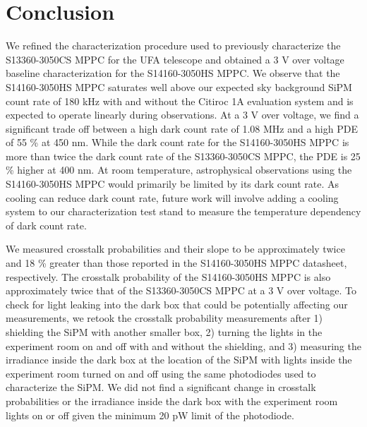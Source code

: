 \documentclass{article}
\begin{document}
\section{Conclusion}
We refined the characterization procedure used to previously characterize the S13360-3050CS MPPC for the UFA telescope and obtained a 3 V over voltage baseline characterization for the S14160-3050HS MPPC. We observe that the S14160-3050HS MPPC saturates well above our expected sky background SiPM count rate of 180 kHz with and without the Citiroc 1A evaluation system and is expected to operate linearly during observations. At a 3 V over voltage, we find a significant trade off between a high dark count rate of 1.08 MHz and a high PDE of 55 \% at 450 nm. While the dark count rate for the S14160-3050HS MPPC is more than twice the dark count rate of the S13360-3050CS MPPC, the PDE is 25 \% higher at 400 nm.\cite{li2019characterization} At room temperature, astrophysical observations using the S14160-3050HS MPPC would primarily be limited by its dark count rate. As cooling can reduce dark count rate, future work will involve adding a cooling system to our characterization test stand to measure the temperature dependency of dark count rate.

We measured crosstalk probabilities and their slope to be approximately twice and 18 \% greater than those reported in the S14160-3050HS MPPC datasheet,\cite{hamamtsu2016s13360} respectively. The crosstalk probability of the S14160-3050HS MPPC is also approximately twice that of the S13360-3050CS MPPC at a 3 V over voltage.\cite{li2019characterization} To check for light leaking into the dark box that could be potentially affecting our measurements, we retook the crosstalk probability measurements after 1) shielding the SiPM with another smaller box, 2) turning the lights in the experiment room on and off with and without the shielding, and 3) measuring the irradiance inside the dark box at the location of the SiPM with lights inside the experiment room turned on and off using the same photodiodes used to characterize the SiPM. We did not find a significant change in crosstalk probabilities or the irradiance inside the dark box with the experiment room lights on or off given the minimum 20 pW limit of the photodiode.
\end{document}
